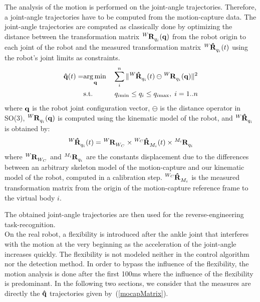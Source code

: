 \documentclass[journal]{IEEEtran}
\begin{document}
The analysis of the motion is performed on the joint-angle trajectories.
Therefore, a joint-angle trajectories have to be computed from the motion-capture data.
The joint-angle trajectories are computed as classically done by optimizing the distance
between the transformation matrix $\tensor[^{W}]{\mathbf{R}}{_{q_i}}(\mbf{q})$ from the 
robot origin to each joint of the robot and the measured
transformation matrix $\tensor[^{W}]{\mathbf{\hat{R}}}{_{q_i}}(t)$ using the robot's joint limits
as constraints. 
\begin{eqnarray}
  \mbf{\hat{q}}(t) =  & \underset{\mbf{q}}\argmin & \sum_i^n \Vert \tensor[^{W}]{\mathbf{\hat{R}}}{_{q_i}}(t) \ominus \tensor[^{W}]{\mathbf{R}}{_{q_i}}(\mbf{q}) \Vert ^2\\
    & \text{s.t.} & q_{i\mathrm{min}} \leq q_i \leq q_{i\mathrm{max}}, \; i = 1..n
  \label{mocapOpti}
\end{eqnarray}
where ${\mathbf{q}}$ is the robot joint configuration vector,
$\ominus$ is the distance operator in SO(3), 
$\tensor[^{W}]{\mathbf{R}}{_{q_i}}(\mbf{q})$ is computed using the kinematic
model of the robot, and $\tensor[^{W}]{\mathbf{\hat{R}}}{_{q_i}}$ is obtained by:
\begin{equation}
  \tensor[^{W}]{\mathbf{\hat{R}}}{_{q_i}}(t) = \tensor[^{W}]{\mathbf{R}}{_{W_{C}}} \times \tensor[^{W_{C}}]{\mathbf{\hat{R}}}{_{M_i}}(t) \times \tensor[^{M_i}]{\mathbf{R}}{_{q_i}}    
  \label{mocapMatrix}
\end{equation}
where $\tensor[^{W}]{\mathbf{R}}{_{W_{C}}}$ and $\tensor[^{M_i}]{\mathbf{R}}{_{q_i}}$ are the constants
displacement due to the differences between an arbitrary skeleton model of the motion-capture and our kinematic model of the robot,
computed in a calibration step.
$\tensor[^{W_{C}}]{\mathbf{\hat{R}}}{_{M_i}}$
is the measured transformation matrix from the origin of the motion-capture reference frame
to the virtual body $i$. 

The obtained joint-angle trajectories are then used for the reverse-engineering task-recognition.\\

On the real robot, a flexibility is introduced after the ankle joint that
interferes with the motion at the very beginning as the acceleration
of the joint-angle increases quickly. The flexibility is not modeled 
neither in the control algorithm nor the detection method.
In order to bypass the influence of the flexibility, the motion analysis is done after the first 100ms
where the influence of the flexibility is predominant.
In the following two sections, we consider that the measures are directly the ${\mathbf{\hat{q}}}$ trajectories
given by~(\ref{mocapMatrix}).
\end{document}
